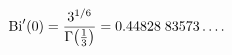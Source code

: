 \[\mathop{\mathrm{Bi}\/}\nolimits'\!\left(0\right)=\frac{3^{1/6}}{\mathop{\Gamma%
\/}\nolimits\!\left(\tfrac{1}{3}\right)}=0.44828\;83573\ldots.\]